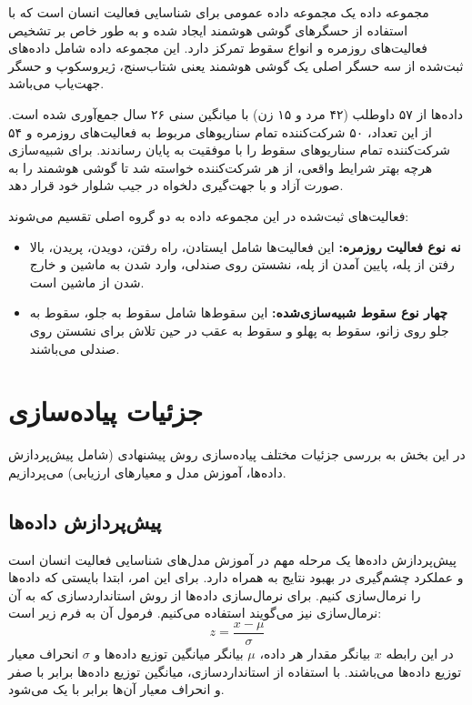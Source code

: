 مجموعه داده 
یک مجموعه داده عمومی برای شناسایی فعالیت انسان  است که با استفاده از حسگرهای گوشی هوشمند ایجاد شده و به طور خاص بر تشخیص فعالیت‌های روزمره و انواع سقوط
تمرکز دارد. این مجموعه داده شامل داده‌های ثبت‌شده از سه حسگر اصلی یک گوشی هوشمند 
یعنی شتاب‌سنج، ژیروسکوپ و حسگر جهت‌یاب می‌باشد.

داده‌ها از ۵۷ داوطلب (۴۲ مرد و ۱۵ زن) با میانگین سنی ۲۶ سال جمع‌آوری شده است. از این تعداد، ۵۰ شرکت‌کننده تمام سناریوهای مربوط به فعالیت‌های روزمره و ۵۴ شرکت‌کننده تمام سناریوهای سقوط را با موفقیت به پایان رساندند. برای شبیه‌سازی هرچه بهتر شرایط واقعی، از هر شرکت‌کننده خواسته شد تا گوشی هوشمند را به صورت آزاد و با جهت‌گیری دلخواه در جیب شلوار خود قرار دهد.

فعالیت‌های ثبت‌شده در این مجموعه داده به دو گروه اصلی تقسیم می‌شوند:
\begin{itemize}
    \item\textbf{نه نوع فعالیت روزمره:}  این فعالیت‌ها شامل ایستادن، راه رفتن، دویدن، پریدن، بالا رفتن از پله، پایین آمدن از پله، نشستن روی صندلی، وارد شدن به ماشین و خارج شدن از ماشین است.
    \item\textbf{چهار نوع سقوط شبیه‌سازی‌شده:}  این سقوط‌ها شامل سقوط به جلو، سقوط به جلو روی زانو، سقوط به پهلو و سقوط به عقب در حین تلاش برای نشستن روی صندلی می‌باشند.
\end{itemize}

\section{جزئیات پیاده‌سازی}

در این بخش به بررسی جزئیات مختلف پیاده‌سازی روش پیشنهادی (شامل پیش‌پردازش داده‌ها، آموزش مدل و معیارهای ارزیابی) می‌پردازیم.

\subsection{پیش‌پردازش داده‌ها}

پیش‌پردازش داده‌ها یک مرحله مهم در آموزش مدل‌های شناسایی فعالیت انسان است و عملکرد چشم‌گیری در بهبود نتایج به همراه دارد. برای این امر، ابتدا بایستی که داده‌ها را نرمال‌سازی کنیم. برای نرمال‌سازی داده‌ها از روش استانداردسازی که به آن نرمال‌سازی  نیز می‌گویند استفاده می‌کنیم. فرمول آن به فرم زیر است:
\begin{equation}
    z=\frac{x-\mu}{\sigma}
\end{equation}
در این رابطه $x$ بیانگر مقدار هر داده، $\mu$ بیانگر میانگین توزیع داده‌ها و $\sigma$ انحراف معیار توزیع داده‌ها می‌باشند. با استفاده از استانداردسازی، میانگین توزیع داده‌ها برابر با صفر و انحراف معیار آن‌ها برابر با یک می‌شود.

